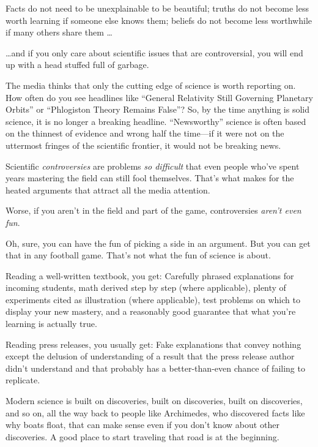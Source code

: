 \myendsectiontext


{
 Facts do not need to be unexplainable to be beautiful; truths do
not become less worth learning if someone else knows them; beliefs do
not become less worthwhile if many others share them \ldots }

{
 \ldots and if you only care about scientific issues that are
controversial, you will end up with a head stuffed full of garbage.}

{
 The media thinks that only the cutting edge of science is worth
reporting on. How often do you see headlines like
``General Relativity Still Governing Planetary
Orbits'' or ``Phlogiston Theory
Remains False''? So, by the time anything is solid
science, it is no longer a breaking headline.
``Newsworthy'' science is often
based on the thinnest of evidence and wrong half the time---if it were
not on the uttermost fringes of the scientific frontier, it would not
be breaking news.}

{
 Scientific \textit{controversies} are problems \textit{so
difficult} that even people who've spent years
mastering the field can still fool themselves. That's
what makes for the heated arguments that attract all the media
attention.}

{
 Worse, if you aren't in the field and part of the
game, controversies \textit{aren't even fun}.}

{
 Oh, sure, you can have the fun of picking a side in an argument.
But you can get that in any football game. That's not
what the fun of science is about.}

{
 Reading a well-written textbook, you get: Carefully phrased
explanations for incoming students, math derived step by step (where
applicable), plenty of experiments cited as illustration (where
applicable), test problems on which to display your new mastery, and a
reasonably good guarantee that what you're learning is
actually true.}

{
 Reading press releases, you usually get: Fake explanations that
convey nothing except the delusion of understanding of a result that
the press release author didn't understand and that
probably has a better-than-even chance of failing to replicate.}

{
 Modern science is built on discoveries, built on discoveries,
built on discoveries, and so on, all the way back to people like
Archimedes, who discovered facts like why boats float, that can make
sense even if you don't know about other discoveries. A
good place to start traveling that road is at the beginning.}

